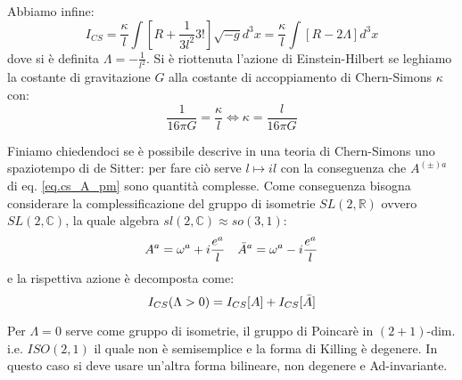 Abbiamo infine:
\begin{equation*}
    I_{CS} = \frac{\kappa}{l}\int\left[ R + \frac{1}{3l^2}3!\right]\sqrt{-g}d^3x = \frac{\kappa}{l}\int\left[R -2 \Lambda\right] d^3x
\end{equation*}
dove si è definita $\Lambda =  - \frac{1}{l^2}$. Si è riottenuta l'azione di Einstein-Hilbert se leghiamo la costante di gravitazione $G$ alla costante di accoppiamento di Chern-Simons $\kappa$ con:
\begin{equation}
    \frac{1}{16\pi G} = \frac{\kappa}{l} \iff \kappa = \frac{l}{16\pi G}
    \label{eq.cost_accopp_cs_grav3d}
\end{equation}

Finiamo chiedendoci se è possibile descrive in una teoria di Chern-Simons uno spaziotempo di de Sitter: per fare ciò serve $l \mapsto il$ con la conseguenza che $A^{(\pm)a}$ di eq. \ref{eq.cs_A_pm} sono quantità complesse. Come conseguenza bisogna considerare la complessificazione del gruppo di isometrie $SL(2,\mathbb R)$ ovvero $SL(2,\mathbb C)$, la quale algebra $sl(2,\mathbb C) \approx so(3,1)$:
\begin{align*}
    A^a = \omega^a + i\frac{e^a}{l} && \Bar{A}^a = \omega^a - i\frac{e^a}{l}
\end{align*}
e la rispettiva azione è decomposta come:
\begin{equation*}
    I_{CS}(\Lambda > 0) = I_{CS}[A] + I_{CS}[\Bar{A}]
\end{equation*}

Per $\Lambda = 0$ serve come gruppo di isometrie, il gruppo di Poincarè in $(2+1)$-dim. i.e. $ISO(2,1)$ il quale non è semisemplice e la forma di Killing è degenere. In questo caso si deve usare un'altra forma bilineare, non degenere e Ad-invariante.